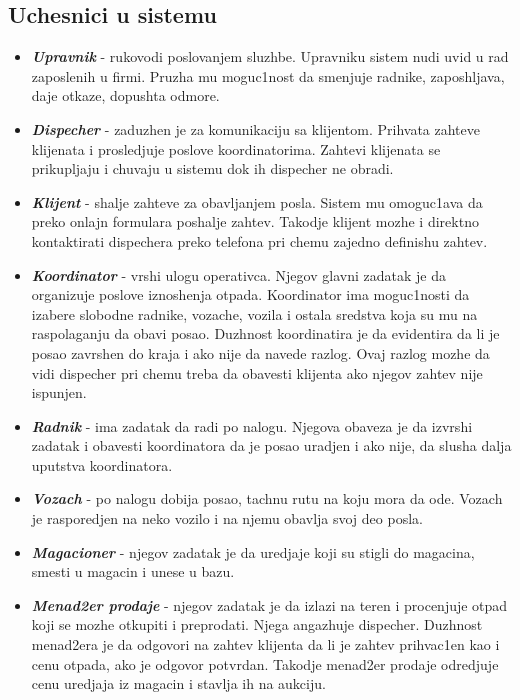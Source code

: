 \documentclass[10 pt]{article}
\begin{document}
	\subsection{Uchesnici u sistemu}
	
	\begin{itemize}
		
		\item\textbf{\textit{Upravnik}} - rukovodi poslovanjem sluzhbe. Upravniku sistem nudi uvid u rad zaposlenih u firmi. Pruzha mu moguc1nost da smenjuje radnike, zaposhljava, daje otkaze, dopushta odmore.
		
		\item\textbf{\textit{Dispecher}} - zaduzhen je za komunikaciju sa klijentom. Prihvata zahteve klijenata i prosledjuje poslove koordinatorima. Zahtevi klijenata se prikupljaju i chuvaju u sistemu dok ih dispecher ne obradi.
		
		\item\textbf{\textit{Klijent}} - shalje zahteve za obavljanjem posla. Sistem mu omoguc1ava da preko onlajn formulara poshalje zahtev. Takodje klijent mozhe i direktno kontaktirati dispechera preko telefona pri chemu zajedno definishu zahtev. 
		
		\item\textbf{\textit{Koordinator}} - vrshi ulogu operativca. Njegov glavni zadatak je da organizuje poslove iznoshenja otpada. Koordinator ima moguc1nosti da izabere slobodne radnike, vozache, vozila i ostala sredstva koja su mu na raspolaganju da obavi posao. Duzhnost koordinatira je da evidentira da li je posao zavrshen do kraja i ako nije da navede razlog. Ovaj razlog mozhe da vidi dispecher pri chemu treba da obavesti klijenta ako njegov zahtev nije ispunjen.
		
		\item\textbf{\textit{Radnik}} - ima zadatak da radi po nalogu. Njegova obaveza je da izvrshi zadatak i obavesti koordinatora da je posao uradjen i ako nije, da slusha dalja uput{s}tva koordinatora.
		
		\item\textbf{\textit{Vozach}} - po nalogu dobija posao, tachnu rutu na koju mora da ode. Vozach je rasporedjen na neko vozilo i na njemu obavlja svoj deo posla.
		
		\item\textbf{\textit{Magacioner}} - njegov zadatak je da uredjaje koji su stigli do magacina, smesti u magacin i unese u bazu.
		
		\item\textbf{\textit{Menad2er prodaje}} - njegov zadatak je da izlazi na teren i procenjuje otpad koji se mozhe otkupiti i preprodati.
		Njega angazhuje dispecher. Duzhnost menad2era je da odgovori na zahtev klijenta da li je zahtev prihvac1en kao i cenu otpada, ako je odgovor potvrdan. Takodje menad2er prodaje odredjuje cenu uredjaja iz magacin i stavlja ih na aukciju.
	
	\end{itemize}	
	
\end{document}
